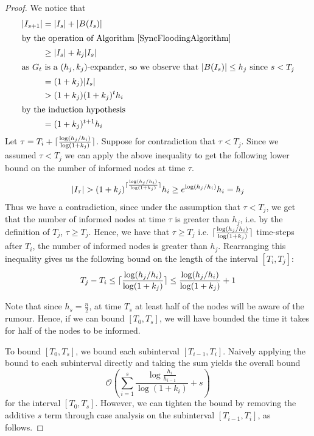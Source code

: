 \begin{proof}
	We notice that 
	\begin{align*}
		|I_{s+1}| &= |I_s| + |B(I_s)| \\
		\intertext{by the operation of Algorithm \ref{SyncFloodingAlgorithm}}
		& \geq |I_s| + k_j |I_s| \\ %
		\intertext{as $G_t$ is a $(h_j, k_j)$-expander, so we observe that $|B(I_s)| \leq h_j$ since $s < T_j$}
		& = (1 + k_j)|I_s| \\
		& > (1 + k_j)(1+k_j)^t h_i \\
		\intertext{by the induction hypothesis}
		& = (1+k_j)^{t+1} h_i
	\end{align*}
	Let $\tau = T_i + \lceil \frac{\log (h_j/h_i)}{\log(1+k_j)}\rceil$. 
	Suppose for contradiction that $\tau < T_j$. %
	Since we assumed $\tau < T_j$ we can apply the above inequality %
	to get the following lower bound on the number of informed nodes at time $\tau$.
	$$
		|I_\tau| > 
		(1+k_j)^{\lceil \frac{\log (h_j/h_i)}{\log(1+k_j)}\rceil} h_i
		\geq e^{\log (h_j/h_i)} h_i
		= h_j
	$$
	Thus we have a contradiction, since under the assumption that $\tau < T_j$, we get that the number of informed nodes at time $\tau$ is greater than $h_j$, i.e. by the definition of $T_j$, $\tau \geq T_j$. Hence, we have that $\tau \geq T_j$ i.e. $\lceil \frac{\log (h_j/h_i)}{\log(1+k_j)}\rceil$ time-steps after $T_i$, the number of informed nodes is greater than $h_j$. Rearranging this inequality gives us the following bound on the length of the interval $[T_i, T_j]$:
	\begin{equation} \label{eq:FloodingIntervalBound}
		T_j - T_i \leq \lceil \frac{\log (h_j/h_i)}{\log(1+k_j)}\rceil \leq \frac{\log (h_j/h_i)}{\log(1+k_j)} + 1
	\end{equation}

	Note that since $h_s = \frac{n}{2}$, at time $T_s$ at least half of the nodes will be aware of the rumour. Hence, if we can bound $[T_0, T_s]$, we will have bounded the time it takes for half of the nodes to be informed. 

	To bound $[T_0, T_s]$, we bound each subinterval $[T_{i-1}, T_i]$. Naively applying the bound to each subinterval directly and taking the sum yields the overall bound 
	$$
		\mathcal{O}\left(\sum_{i=1}^s \frac{\log \frac{h_i}{h_{i-1}}}{\log(1+k_i)} + s\right)
	$$ 
	for the interval $[T_0,T_s]$. However, we can tighten the bound by removing the additive $s$ term through case analysis on the subinterval $[T_{i-1}, T_i]$, as follows.


\end{proof}

